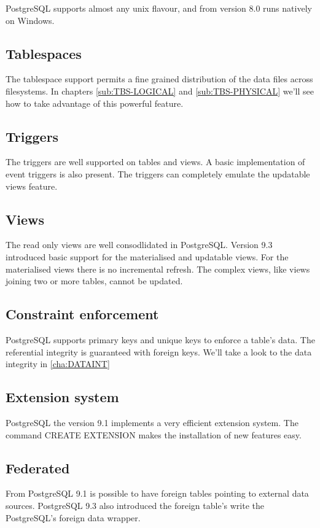 PostgreSQL supports almost any unix flavour, and from version
8.0 runs natively on Windows.

\subsection{Tablespaces}

The tablespace support permits a fine grained distribution of the data files
across filesystems. In chapters \ref{sub:TBS-LOGICAL} and
\ref{sub:TBS-PHYSICAL} we'll see how to take advantage of this powerful
feature.

\subsection{Triggers}

The triggers are well supported on tables and views. A basic implementation of
event triggers is also present. The triggers can completely emulate the
updatable views feature.

\subsection{Views}

The read only views are well consodlidated in PostgreSQL. Version 9.3
introduced basic support for the materialised and updatable views. For the
materialised views there is no incremental refresh. The complex views, like
views joining two or more tables, cannot be updated.

\subsection{Constraint enforcement}

PostgreSQL supports primary keys and unique keys to enforce a table's data. The
referential integrity is guaranteed with foreign keys. We'll take a look to the
data integrity in \ref{cha:DATAINT}

\subsection{Extension system}

PostgreSQL the version 9.1 implements a very efficient extension system. The
command CREATE EXTENSION makes the installation of new features easy.

\subsection{Federated}

From PostgreSQL 9.1 is possible to have foreign tables pointing to external
data sources. PostgreSQL 9.3 also introduced the foreign table's write the
PostgreSQL's foreign data wrapper.
